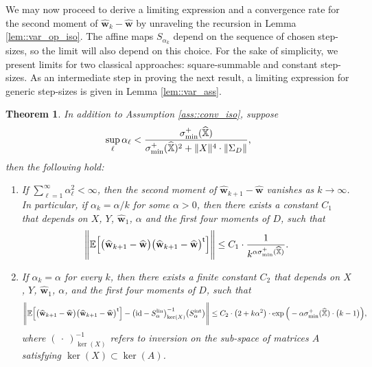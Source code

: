 \documentclass{article}
\newcommand*{\E}{\mathbb{E}} %
\newcommand*{\bbX}{\mathbb{X}}
\newcommand*{\bfw}{\mathbf{w}}
\newcommand*{\inv}{^{-1}}
\newcommand*{\tran}{^{\mathsf{t}}}
\newcommand*{\sigminp}{\sigma_{\mathrm{min}}^+}
\DeclarePairedDelimiter{\norm}{\lVert}{\rVert}
\newcommand*{\id}{\mathrm{id}}
\newcommand{\whweight}{\widehat{\bfw}}
\newcommand{\whbbX}{\widehat{\bbX}}
\newcommand{\Slin}{S^{\mathrm{lin}}}
\newcommand{\Sint}{S^{\mathrm{int}}}
\newtheorem{theorem}[lemma]{Theorem}
\begin{document}
We may now proceed to derive a limiting expression and a convergence rate for
the second moment of $\whweight_k - \whweight$ by unraveling the recursion in
Lemma \ref{lem::var_op_iso}. The affine maps $S_{\alpha_k}$ depend on the
sequence of chosen step-sizes, so the limit will also depend on this choice. For
the sake of simplicity, we present limits for two classical approaches:
square-summable and constant step-sizes. As an intermediate step in proving the
next result, a limiting expression for generic step-sizes is given in Lemma
\ref{lem::var_ass}.

\begin{theorem}
  \label{thm::var_conv_iso}
  In addition to Assumption \ref{ass::conv_iso}, suppose \begin{align*}
    \sup_{\ell} \alpha_\ell < \dfrac{\sigminp(\whbbX)}{\sigminp(\whbbX)^2 +
    \norm{X}^4 \cdot \norm{\Sigma_D}},
  \end{align*} then the following hold: \begin{enumerate}
  \item If $\sum_{\ell = 1}^\infty \alpha_\ell^2 < \infty$, then the second
    moment of $\whweight_{k + 1} - \whweight$ vanishes as $k \to \infty$. In
    particular, if $\alpha_k = \alpha / k$ for some $\alpha > 0$, then there
    exists a constant $C_1$ that depends on $X$, $Y$, $\whweight_1$, $\alpha$
    and the first four moments of $D$, such that \begin{align*}
        \norm[\Bigg]{\E\Big[\big(\whweight_{k + 1} - \whweight\big)
        \big(\whweight_{k + 1} - \whweight\big)\tran\Big]} \leq C_1 \cdot
        \dfrac{1}{k^{\alpha \sigminp(\whbbX)}}.
      \end{align*} \label{thm::var_conv_iso_a}
    \item If $\alpha_k = \alpha$ for every $k$, then there exists a finite
      constant $C_2$ that depends on $X$, $Y$, $\whweight_1$, $\alpha$, and the
      first four moments of $D$, such that \begin{align*}
        \norm[\Bigg]{\E\Big[\big(\whweight_{k + 1} - \whweight\big)
        \big(\whweight_{k + 1} - \whweight\big)\tran\Big] - \big(\id -
        \Slin_\alpha\big)\inv_{\ker(X)} \big(\Sint_\alpha\big)} \leq C_2 \cdot
        \big(2 + k \alpha^2\big) \cdot \exp\Big(- \alpha \sigminp(\whbbX) \cdot
        \big(k - 1\big)\Big),
      \end{align*} where $(\ \cdot\ )_{\ker(X)}\inv$ refers to inversion on the
      sub-space of matrices $A$ satisfying $\ker(X) \subset \ker(A)$.
      \label{thm::var_conv_iso_b}
  \end{enumerate}
\end{theorem}
\end{document}
